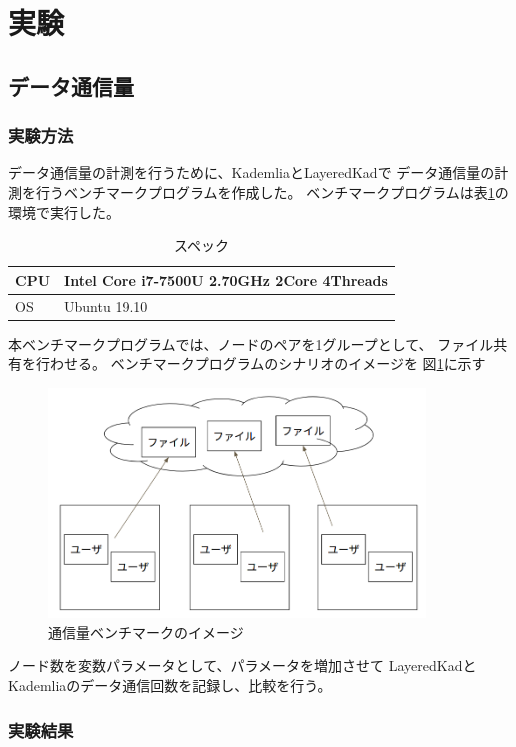 \documentclass[sotsuron]{jcsie}
\begin{document}
\section{実験}
\subsection{データ通信量}
\subsubsection{実験方法}
データ通信量の計測を行うために、KademliaとLayeredKadで
データ通信量の計測を行うベンチマークプログラムを作成した。
ベンチマークプログラムは表\ref{table:spec-note}の環境で実行した。

\begin{table}[H]
	\caption{スペック}	
	\centering
	\label{table:spec-note}
	\begin{tabular}{|l|l|}
		\hline
		CPU &   
		Intel Core i7-7500U 2.70GHz 2Core 4Threads\\ 
		\hline	
		OS  &   
		Ubuntu 19.10 \\ 
		\hline
	\end{tabular}	
\end{table}

本ベンチマークプログラムでは、ノードのペアを1グループとして、
ファイル共有を行わせる。
ベンチマークプログラムのシナリオのイメージを
図\ref{fig:trafficBenchmark}に示す

\begin{figure}[H]
	\centering
	\includegraphics[width=10cm]{./assets/image/traffic_benchmark.png}
	\caption{通信量ベンチマークのイメージ}
	\label{fig:trafficBenchmark}
\end{figure}

ノード数を変数パラメータとして、パラメータを増加させて
LayeredKadとKademliaのデータ通信回数を記録し、比較を行う。

\subsubsection{実験結果}
\end{document}

